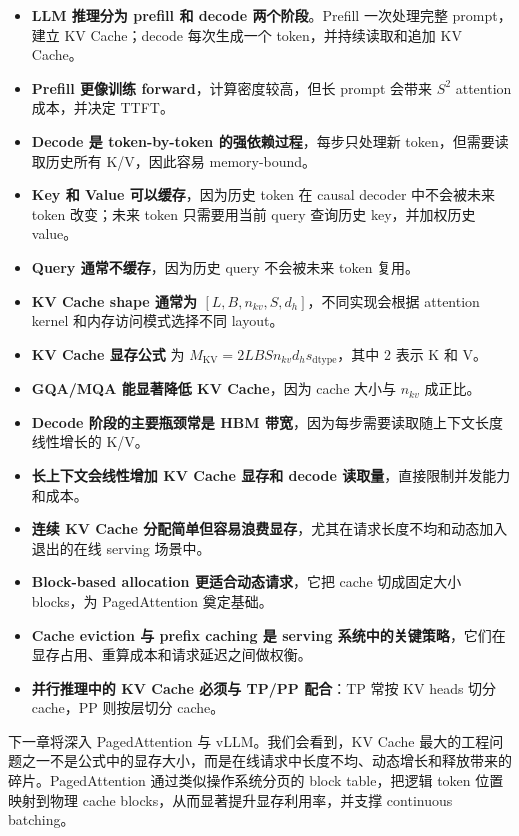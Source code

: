 \begin{itemize}
\item \textbf{LLM 推理分为 prefill 和 decode 两个阶段}。Prefill 一次处理完整 prompt，建立 KV Cache；decode 每次生成一个 token，并持续读取和追加 KV Cache。
\item \textbf{Prefill 更像训练 forward}，计算密度较高，但长 prompt 会带来 $S^2$ attention 成本，并决定 TTFT。
\item \textbf{Decode 是 token-by-token 的强依赖过程}，每步只处理新 token，但需要读取历史所有 K/V，因此容易 memory-bound。
\item \textbf{Key 和 Value 可以缓存}，因为历史 token 在 causal decoder 中不会被未来 token 改变；未来 token 只需要用当前 query 查询历史 key，并加权历史 value。
\item \textbf{Query 通常不缓存}，因为历史 query 不会被未来 token 复用。
\item \textbf{KV Cache shape 通常为 $[L,B,n_{kv},S,d_h]$}，不同实现会根据 attention kernel 和内存访问模式选择不同 layout。
\item \textbf{KV Cache 显存公式} 为 $M_{\mathrm{KV}}=2LBSn_{kv}d_hs_{\mathrm{dtype}}$，其中 $2$ 表示 K 和 V。
\item \textbf{GQA/MQA 能显著降低 KV Cache}，因为 cache 大小与 $n_{kv}$ 成正比。
\item \textbf{Decode 阶段的主要瓶颈常是 HBM 带宽}，因为每步需要读取随上下文长度线性增长的 K/V。
\item \textbf{长上下文会线性增加 KV Cache 显存和 decode 读取量}，直接限制并发能力和成本。
\item \textbf{连续 KV Cache 分配简单但容易浪费显存}，尤其在请求长度不均和动态加入退出的在线 serving 场景中。
\item \textbf{Block-based allocation 更适合动态请求}，它把 cache 切成固定大小 blocks，为 PagedAttention 奠定基础。
\item \textbf{Cache eviction 与 prefix caching 是 serving 系统中的关键策略}，它们在显存占用、重算成本和请求延迟之间做权衡。
\item \textbf{并行推理中的 KV Cache 必须与 TP/PP 配合}：TP 常按 KV heads 切分 cache，PP 则按层切分 cache。
\end{itemize}

下一章将深入 PagedAttention 与 vLLM。我们会看到，KV Cache 最大的工程问题之一不是公式中的显存大小，而是在线请求中长度不均、动态增长和释放带来的碎片。PagedAttention 通过类似操作系统分页的 block table，把逻辑 token 位置映射到物理 cache blocks，从而显著提升显存利用率，并支撑 continuous batching。
